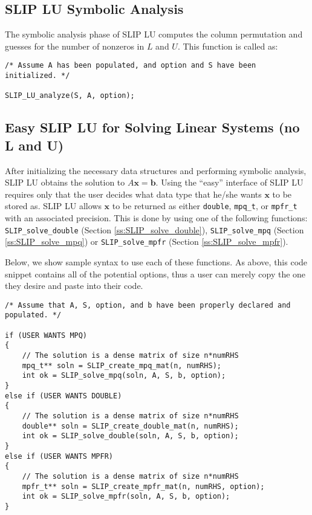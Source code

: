 \documentclass[12pt]{article}
\theoremstyle{definition}
\begin{document}
\cprotect\subsection{SLIP LU Symbolic Analysis} \label{s:Using:symb}

The symbolic analysis phase of SLIP LU computes the column permutation and guesses for the number of nonzeros in $L$ and $U$. This function is called as:

\begin{verbatim}
/* Assume A has been populated, and option and S have been initialized. */

SLIP_LU_analyze(S, A, option);
\end{verbatim}

\cprotect\subsection{Easy SLIP LU for Solving Linear Systems (no L and U)} \label{s:Using:easy}

After initializing the necessary data structures and performing symbolic analysis, SLIP LU obtains the solution to $A \mathbf{x} = \mathbf{b}$. Using the ``easy'' interface of SLIP LU requires only that the user decides what data type that he/she wants $\mathbf{x}$ to be stored as. SLIP LU allows $\mathbf{x}$ to be returned as either \verb|double|, \verb|mpq_t|, or \verb|mpfr_t| with an associated precision. This is done by using one of the following functions: \verb|SLIP_solve_double| (Section \ref{ss:SLIP_solve_double}), \verb|SLIP_solve_mpq| (Section \ref{ss:SLIP_solve_mpq}) or \verb|SLIP_solve_mpfr| (Section \ref{ss:SLIP_solve_mpfr}).

Below, we show sample syntax to use each of these functions. As above, this code snippet contains all of the potential options, thus a user can merely copy the one they desire and paste into their code.

\begin{verbatim}
/* Assume that A, S, option, and b have been properly declared and populated. */

if (USER WANTS MPQ)
{
    // The solution is a dense matrix of size n*numRHS
    mpq_t** soln = SLIP_create_mpq_mat(n, numRHS);
    int ok = SLIP_solve_mpq(soln, A, S, b, option);
}
else if (USER WANTS DOUBLE)
{
    // The solution is a dense matrix of size n*numRHS
    double** soln = SLIP_create_double_mat(n, numRHS);
    int ok = SLIP_solve_double(soln, A, S, b, option);
}
else if (USER WANTS MPFR)
{
    // The solution is a dense matrix of size n*numRHS
    mpfr_t** soln = SLIP_create_mpfr_mat(n, numRHS, option);
    int ok = SLIP_solve_mpfr(soln, A, S, b, option);
}

\end{verbatim}
\end{document}
